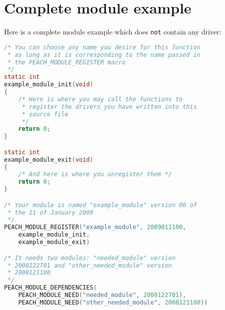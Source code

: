 \section{Complete module example}
\label{sect:module_example}
Here is a complete module example which does \texttt{not} contain
any driver:
\begin{lstlisting}[language=C, caption=Complete module example]
/* You can choose any name you desire for this function
 * as long as it is corresponding to the name passed in 
 * the PEACH_MODULE_REGISTER macro 
 */
static int
example_module_init(void)
{
    /* Here is where you may call the functions to 
     * register the drivers you have written into this 
     * source file 
     */
    return 0; 
}

static int
example_module_exit(void)
{
    /* And here is where you unregister them */
    return 0; 
}

/* Your module is named "example_module" version 00 of 
 * the 11 of January 2009 
 */
PEACH_MODULE_REGISTER("example_module", 2009011100,
    example_module_init,
    example_module_exit)

/* It needs two modules: "needed_module" version 
 * 2008122701 and "other_needed_module" version 
 * 2008121100 
 */
PEACH_MODULE_DEPENDENCIES(
    PEACH_MODULE_NEED("needed_module", 2008122701),
    PEACH_MODULE_NEED("other_needed_module", 2008121100))

\end{lstlisting}

